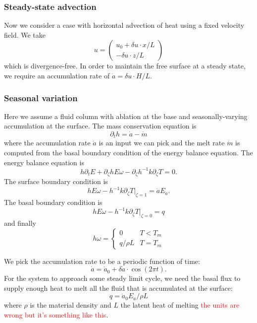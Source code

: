 \documentclass{article}
\theoremstyle{definition}
\theoremstyle{plain}
\begin{document}
\subsubsection{Steady-state advection}
Now we consider a case with horizontal advection of heat using a fixed velocity field.
We take
\begin{equation}
    u = \left(\begin{matrix}u_0 + \delta u\cdot x / L \\ -\delta u \cdot z / L\end{matrix}\right)
\end{equation}
which is divergence-free.
In order to maintain the free surface at a steady state, we require an accumulation rate of $\dot a = \delta u \cdot H / L$.

\subsubsection{Seasonal variation}
Here we assume a fluid column with ablation at the base and seasonally-varying accumulation at the surface.
The mass conservation equation is
\begin{equation}
    \partial_th = \dot a - \dot m
\end{equation}
where the accumulation rate $\dot a$ is an input we can pick and the melt rate $\dot m$ is computed from the basal boundary condition of the energy balance equation.
The energy balance equation is
\begin{equation}
    h\partial_t E + \partial_\zeta hE\omega - \partial_\zeta h^{-1}k\partial_\zeta T = 0.
\end{equation}
The surface boundary condition is
\begin{equation}
    hE\omega - h^{-1}k\partial_\zeta T\Big|_{\zeta = 1} = \dot aE_{\dot a}.
\end{equation}
The basal boundary condition is
\begin{equation}
    hE\omega - h^{-1}k\partial_\zeta T\Big|_{\zeta = 0} = q
\end{equation}
and finally
\begin{equation}
    h\omega = \begin{cases}0 & T < T_m \\ q/\rho L & T = T_m\end{cases}
\end{equation}

We pick the accumulation rate to be a periodic function of time:
\begin{equation}
    \dot a = \dot a_0 + \delta\dot a\cdot\cos(2\pi t).
\end{equation}
For the system to approach some steady limit cycle, we need the basal flux to supply enough heat to melt all the fluid that is accumulated at the surface:
\begin{equation}
    q = \dot a_0 E_{\dot a} / \rho L
\end{equation}
where $\rho$ is the material density and $L$ the latent heat of melting \textcolor{red}{the units are wrong but it's something like this}.
\end{document}
